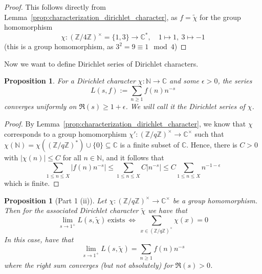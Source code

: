 \documentclass{scrartcl}
\newcommand{\N}{\mathbb{N}}
\newcommand{\Z}{\mathbb{Z}}
\newcommand{\C}{\mathbb{C}}
\newcommand{\units}{\times}
\newtheorem{proposition}[definition]{Proposition}
\begin{document}
\begin{proof}
    This follows directly from Lemma~\ref{prop:characterization_dirichlet_character}, as $f = \tilde{\chi}$ for the group homomorphism
    \begin{equation*}
        \chi: (\Z/4\Z)^\units = \{ 1, 3 \} \to \C^*, \quad 1 \mapsto 1, \ 3 \mapsto -1
    \end{equation*}
    (this is a group homomorphism, as $3^2 = 9 \equiv 1 \mod 4$)
\end{proof}
Now we want to define Dirichlet series of Dirichlet characters.
\begin{proposition}
    For a Dirichlet character $\chi: \N \to \C$ and some $\epsilon > 0$, the series
    \begin{equation*}
        L(s, f) := \sum_{n \geq 1} f(n) n^{-s}
    \end{equation*}
    converges uniformly on $\Re(s) \geq 1 + \epsilon$.
    We will call it the Dirichlet series of $\chi$.
\end{proposition}
\begin{proof}
    By Lemma~\ref{prop:characterization_dirichlet_character}, we know that $\chi$ corresponds to a group homomorphism $\chi': (\Z/q\Z)^\units \to \C^\units$ such that $\chi(\N) = \chi((\Z/q\Z)^*) \cup \{ 0 \} \subseteq \C$ is a finite subset of $\C$.
    Hence, there is $C > 0$ with $|\chi(n)| \leq C$ for all $n \in \N$, and it follows that
    \begin{equation*}
        \sum_{1 \leq n \leq X} \left| f(n) n^{-s} \right| \leq \sum_{1 \leq n \leq X} C \left| n^{-s} \right| \leq C \sum_{1 \leq n \leq X} n^{-1 - \epsilon}
    \end{equation*}
    which is finite.
\end{proof}
\begin{proposition}[Part 1 (ii)]
    \label{prop:dirichlet_series_at_one}
    Let $\chi: (\Z/q\Z)^\units \to \C^\units$ be a group homomorphism. Then for the associated Dirichlet character $\tilde{\chi}$ we have that
    \begin{equation*}
        \lim_{s \to 1^+} L(s, \tilde{\chi}) \ \text{exists} \ \Leftrightarrow \ \sum_{x \in (\Z/q\Z)^\units} \chi(x) = 0
    \end{equation*}
    In this case, have that
    \begin{equation*}
        \lim_{s \to 1^+} L(s, \tilde{\chi}) = \sum_{n \geq 1} f(n) n^{-s}
    \end{equation*}
    where the right sum converges (but not absolutely) for $\Re(s) > 0$.
\end{proposition}
\end{document}
